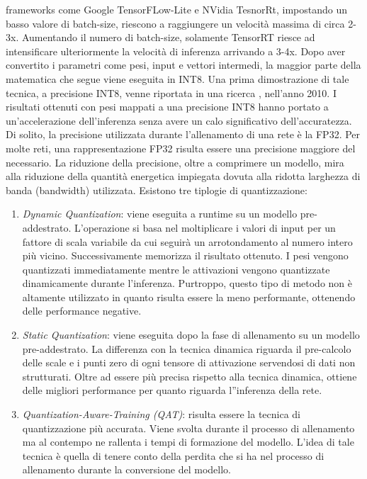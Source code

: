 frameworks come Google TensorFLow-Lite e NVidia TesnorRt, impostando 
un basso valore di batch-size, riescono a raggiungere un velocità massima 
di circa 2-3x. Aumentando il numero di batch-size, solamente TensorRT 
riesce ad intensificare ulteriormente la velocità di inferenza arrivando a 
3-4x. Dopo aver convertito i parametri come pesi, input e vettori intermedi, 
la maggior parte della matematica che segue viene eseguita in INT8. Una 
prima dimostrazione di tale tecnica, a precisione INT8, venne riportata 
in una ricerca \cite{37631}, nell'anno 2010. I risultati ottenuti con pesi mappati 
a una precisione INT8 hanno portato a un'accelerazione dell'inferenza 
senza avere un calo significativo dell'accuratezza. Di solito, la precisione 
utilizzata durante l'allenamento di una rete è la FP32. Per molte reti, una 
rappresentazione FP32 risulta essere una precisione maggiore del necessario.
La riduzione della precisione, oltre a comprimere un modello, mira alla riduzione della 
quantità energetica impiegata dovuta alla ridotta larghezza 
di banda (bandwidth) utilizzata. Esistono tre tiplogie di quantizzazione:
\begin{enumerate}
    \item \emph{Dynamic Quantization}: viene eseguita a runtime su un modello pre-addestrato. 
    L'operazione si basa nel moltiplicare i valori di input 
    per un fattore di scala variabile da cui seguirà un arrotondamento al 
    numero intero più vicino. Successivamente memorizza il risultato ottenuto. 
    I pesi vengono quantizzati immediatamente mentre le attivazioni 
    vengono quantizzate dinamicamente durante l'inferenza. Purtroppo, 
    questo tipo di metodo non è altamente utilizzato in quanto risulta 
    essere la meno performante, ottenendo delle performance negative.
    \item \emph{Static Quantization}: viene eseguita dopo la fase di allenamento su un 
    modello pre-addestrato. La differenza con la tecnica dinamica riguarda 
    il pre-calcolo delle scale e i punti zero di ogni tensore di attivazione 
    servendosi di dati non strutturati. Oltre ad essere più precisa rispetto 
    alla tecnica dinamica, ottiene delle migliori performance per quanto 
    riguarda l''inferenza della rete.
    \item \emph{Quantization-Aware-Training (QAT)}: risulta essere la tecnica di quantizzazione 
    più accurata. Viene svolta durante il processo di allenamento 
    ma al contempo ne rallenta i tempi di formazione del modello. 
    L'idea di tale tecnica è quella di tenere conto della perdita che si ha 
    nel processo di allenamento durante la conversione del modello.
\end{enumerate}


